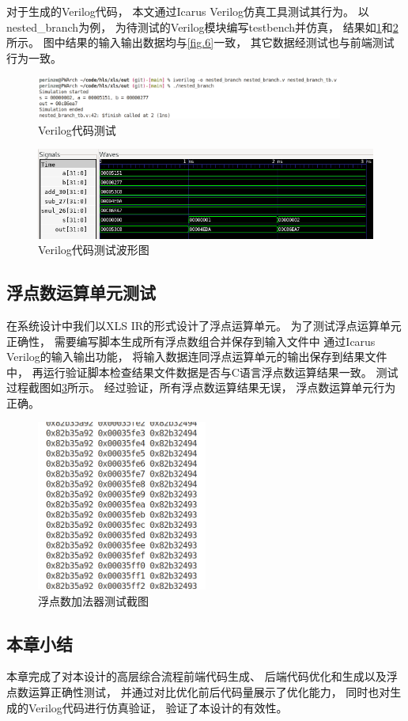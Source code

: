 对于生成的Verilog代码，
本文通过Icarus Verilog仿真工具测试其行为。
以nested\_branch为例，
为待测试的Verilog模块编写testbench并仿真，
结果如\ref{fig.12}和\ref{fig.13}所示。
图中结果的输入输出数据均与\ref{fig.6}一致，
其它数据经测试也与前端测试行为一致。

\begin{figure}[h]
\centering
\includegraphics[width=0.9\textwidth]{figure/verilog_test.png}
\caption{Verilog代码测试}
\label{fig.12}
\end{figure}

\begin{figure}[h]
\centering
\includegraphics{figure/wave.png}
\caption{Verilog代码测试波形图}
\label{fig.13}
\end{figure}

\pagebreak

\subsection{浮点数运算单元测试}

在系统设计中我们以XLS IR的形式设计了浮点运算单元。
为了测试浮点运算单元正确性，
需要编写脚本生成所有浮点数组合并保存到输入文件中
通过Icarus Verilog的输入输出功能，
将输入数据连同浮点运算单元的输出保存到结果文件中，
再运行验证脚本检查结果文件数据是否与C语言浮点数运算结果一致。
测试过程截图如\ref{fig:float_test}所示。
经过验证，所有浮点数运算结果无误，
浮点数运算单元行为正确。

\begin{figure}[h]
\centering
\includegraphics[width=0.5\textwidth]{figure/float_add_test.png}
\caption{浮点数加法器测试截图}
\label{fig:float_test}
\end{figure}

\subsection{本章小结}

本章完成了对本设计的高层综合流程前端代码生成、
后端代码优化和生成以及浮点数运算正确性测试，
并通过对比优化前后代码量展示了优化能力，
同时也对生成的Verilog代码进行仿真验证，
验证了本设计的有效性。